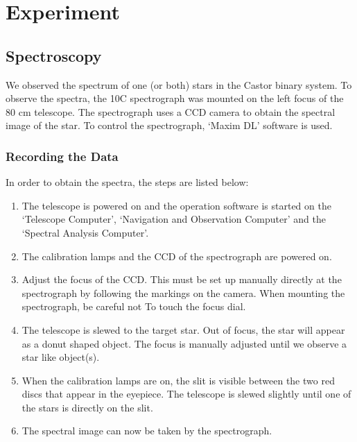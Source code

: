 \documentclass[12pt,a4paper]{article}
\begin{document}
\section{Experiment} 
\subsection{Spectroscopy}
    We observed the spectrum of one (or both) stars in the Castor binary system. To observe the spectra, the 10C spectrograph was mounted on the 
    left focus of the 80 cm telescope. The spectrograph uses a CCD camera to obtain the spectral image of the star. To control the spectrograph, `Maxim DL'
    software is used. 
    \subsubsection{Recording the Data}
      In order to obtain the spectra, the steps are listed below:
      \begin{enumerate}
        \item The telescope is powered on and the operation software is started on the `Telescope Computer', `Navigation and Observation Computer' and the `Spectral Analysis Computer'.
        \item The calibration lamps and the CCD of the spectrograph are powered on.
        \item Adjust the focus of the CCD. This must be set up manually directly at the spectrograph by following the markings on the camera. When mounting the spectrograph, be careful not To
              touch the focus dial.
        \item The telescope is slewed to the target star. Out of focus, the star will appear as a donut shaped object. The focus is manually adjusted until we observe a star like object(s).
        \item When the calibration lamps are on, the slit is visible between the two red discs that appear in the eyepiece. The telescope is slewed slightly until one of the stars is directly on the slit. 
        \item The spectral image can now be taken by the spectrograph. 
      \end{enumerate}
\end{document}
